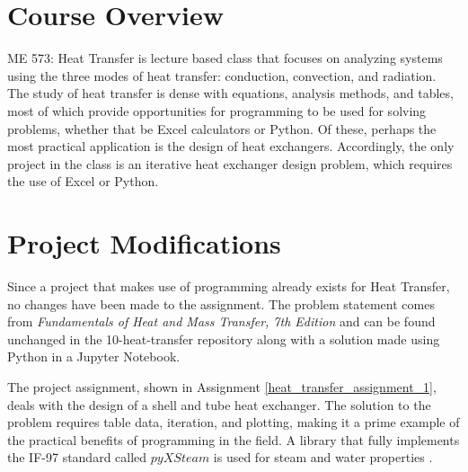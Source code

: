 \section{Course Overview}

ME 573: Heat Transfer is lecture based class that focuses on analyzing systems using
the three modes of heat transfer: conduction, convection, and radiation. The study of
heat transfer is dense with equations, analysis methods, and tables, most of which
provide opportunities for programming to be used for solving problems, whether that
be Excel calculators or Python. Of these, perhaps the most practical application 
is the design of heat exchangers. Accordingly, the only project in the class is an 
iterative heat exchanger design problem, which requires the use of Excel or Python.

\section{Project Modifications}

Since a project that makes use of programming already exists for Heat Transfer, no
changes have been made to the assignment. The problem statement comes from 
\textit{Fundamentals of Heat and Mass Transfer, 7th Edition} \cite{heat-transfer} and 
can be found unchanged in the 10-heat-transfer repository along with a solution made 
using Python in a Jupyter Notebook.

The project assignment, shown in Assignment \ref{heat_transfer_assignment_1}, deals 
with the design of a shell and tube heat exchanger. The solution to the problem requires
table data, iteration, and plotting, making it a prime example of the practical benefits
of programming in the field. A library that fully implements the IF-97 standard called
$pyXSteam$ is used for steam and water properties \cite{pyxsteam2020}.

\label{heat_transfer_assignment_1}

